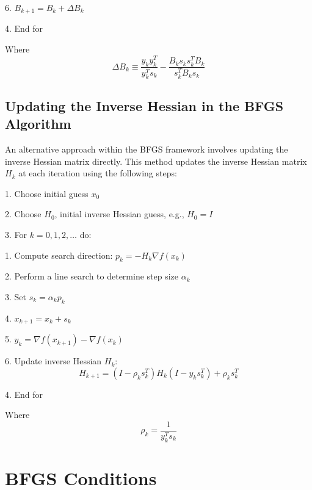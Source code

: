 \documentclass{article}
\begin{document}
\hspace{0.5cm} 6. \( B_{k+1} = B_k + \Delta B_k \)

4. End for

Where
\begin{equation}
\Delta B_k \equiv \frac{y_k y_k^T}{y_k^T s_k} - \frac{B_k s_k s_k^T B_k}{s_k^T B_k s_k}
\end{equation}

\subsection{Updating the Inverse Hessian in the BFGS Algorithm}

An alternative approach within the BFGS framework involves updating the inverse Hessian matrix directly. This method updates the inverse Hessian matrix \( H_k \) at each iteration using the following steps:

1. Choose initial guess \( x_0 \)

2. Choose \( H_0 \), initial inverse Hessian guess, e.g., \( H_0 = I \)

3. For \( k = 0, 1, 2, \ldots \) do:

\hspace{0.5cm} 1. Compute search direction: \( p_k = -H_k \nabla f (x_k) \)

\hspace{0.5cm} 2. Perform a line search to determine step size \( \alpha_k \)

\hspace{0.5cm} 3. Set \( s_k = \alpha_k p_k \)

\hspace{0.5cm} 4. \( x_{k+1} = x_k + s_k \)

\hspace{0.5cm} 5. \( y_k = \nabla f(x_{k+1}) - \nabla f(x_k) \)

\hspace{0.5cm} 6. Update inverse Hessian \( H_k \):
\begin{equation}
H_{k+1} = (I - \rho_k s_k^T) H_k (I - y_k s_k^T) + \rho_k s_k^T
\end{equation}

4. End for

Where
\begin{equation}
\rho_k = \frac{1}{y_k^T s_k}
\end{equation}

\section{BFGS Conditions}
\end{document}
